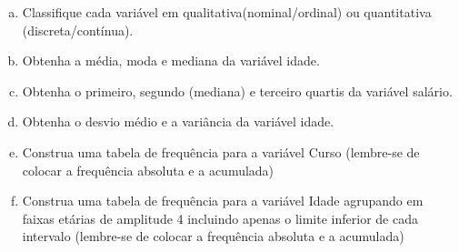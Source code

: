 \documentclass{article}
\begin{document}
\begin{enumerate}[a)]
\item Classifique cada variável em qualitativa(nominal/ordinal) ou quantitativa (discreta/contínua).
\item Obtenha a média, moda e mediana da variável idade.
\item Obtenha o primeiro, segundo (mediana) e terceiro quartis da variável salário.
\item Obtenha o desvio médio e a variância da variável idade.
\item  Construa uma tabela de frequência para a variável Curso (lembre-se de colocar a frequência absoluta e a acumulada)
\item Construa uma tabela de frequência para a variável Idade agrupando em faixas etárias de amplitude 4 incluindo apenas o limite inferior de cada intervalo (lembre-se de colocar a frequência absoluta e a acumulada)
\end{enumerate}
\end{document}
